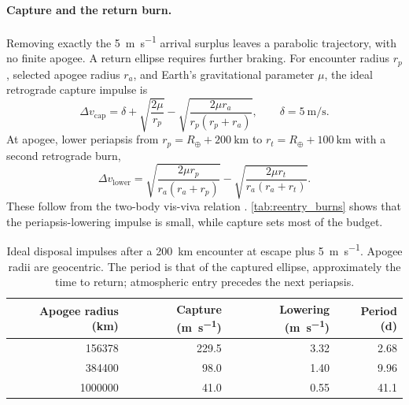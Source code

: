 \documentclass{article}
\newcommand{\deltav}{\Delta v}
\begin{document}
\paragraph{Capture and the return burn.}
Removing exactly the \SI{5}{\meter\per\second} arrival surplus leaves a parabolic trajectory, with no finite apogee. A return ellipse requires further braking. For encounter radius $r_p$, selected apogee radius $r_a$, and Earth's gravitational parameter $\mu$, the ideal retrograde capture impulse is
\begin{equation}
\deltav_{\mathrm{cap}} = \delta + \sqrt{\frac{2\mu}{r_p}} - \sqrt{\frac{2\mu r_a}{r_p(r_p+r_a)}},
\qquad \delta = \SI{5}{\meter\per\second}.
\label{eq:disposal_capture}
\end{equation}
At apogee, lower periapsis from $r_p=R_\oplus+\SI{200}{\kilo\meter}$ to $r_t=R_\oplus+\SI{100}{\kilo\meter}$ with a second retrograde burn,
\begin{equation}
\deltav_{\mathrm{lower}} = \sqrt{\frac{2\mu r_p}{r_a(r_a+r_p)}} - \sqrt{\frac{2\mu r_t}{r_a(r_a+r_t)}}.
\label{eq:disposal_lower}
\end{equation}
These follow from the two-body vis-viva relation \cite{vallado_astrodynamics}. \autoref{tab:reentry_burns} shows that the periapsis-lowering impulse is small, while capture sets most of the budget.

\begin{table}[!htpb]
    \centering
    \caption{Ideal disposal impulses after a \SI{200}{\kilo\meter} encounter at escape plus \SI{5}{\meter\per\second}. Apogee radii are geocentric. The period is that of the captured ellipse, approximately the time to return; atmospheric entry precedes the next periapsis.}
    \label{tab:reentry_burns}
    \begin{tabular}{|r|r|r|r|}
        \hline
        Apogee radius (\si{\kilo\meter}) & Capture (\si{\meter\per\second}) & Lowering (\si{\meter\per\second}) & Period (\si{\day}) \\\hline
        \num{156378} & 229.5 & 3.32 & 2.68 \\\hline
        \num{384400} & 98.0 & 1.40 & 9.96 \\\hline
        \num{1000000} & 41.0 & 0.55 & 41.1 \\\hline
    \end{tabular}
\end{table}
\end{document}
